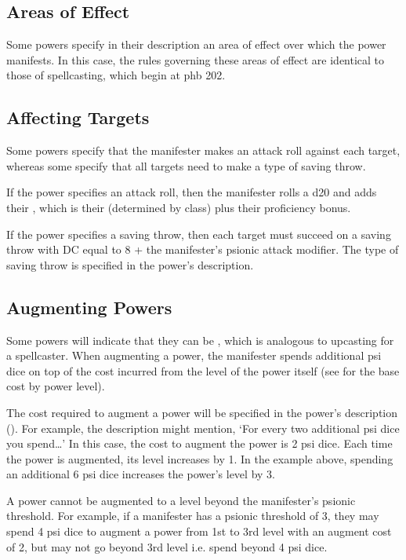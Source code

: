 \subsection{Areas of Effect}
Some powers specify in their description an area of effect
over which the power manifests.
In this case, the rules governing these areas of effect
are identical to those of spellcasting, which begin at
phb 202.

\subsection{Affecting Targets}
Some powers specify that the manifester makes an attack
roll against each target,
whereas some specify that all targets need to make
a type of saving throw.

If the power specifies an attack roll,
then the manifester rolls a d20
and adds their ,
which is their 
(determined by class)
plus their proficiency bonus.

If the power specifies a saving throw,
then each target must succeed on a saving throw
with DC equal to 8 + the manifester's psionic attack modifier.
The type of saving throw
is specified in the power's description.

\subsection{Augmenting Powers}
\label{sub:augmenting}
Some powers will indicate that they can be ,
which is analogous to upcasting for a spellcaster.
When augmenting a power,
the manifester spends additional psi dice on top of the cost
incurred from the level of the power itself
(see  for the base cost by power level).

The cost required to augment a power will be specified
in the power's description ().
For example, the description might mention,
`For every two additional psi dice you spend\dots'
In this case, the cost to augment the power is 2 psi dice.
Each time the power is augmented,
its level increases by 1.
In the example above,
spending an additional 6 psi dice increases the power's level by 3.

A power cannot be augmented to a level beyond the manifester's
psionic threshold.
For example,
if a manifester has a psionic threshold of 3,
they may spend 4 psi dice to augment a power from
1st to 3rd level with an augment cost of 2,
but may not go beyond 3rd level i.e. spend beyond 4 psi dice.

